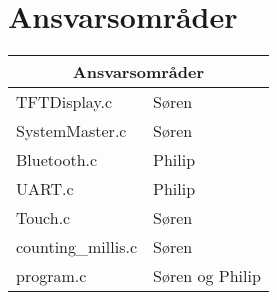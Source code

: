 \graphicspath{{Chapters/Ansvar/}}

\section{Ansvarsområder}
\centering
\label{test_resultater}
\begin{tabular}{ |p{4.2cm}|p{4.2cm}|  }
		\hline
		\multicolumn{2}{|c|}{\textbf{Ansvarsområder}} \\
		\hline
		TFTDisplay.c & Søren \\
		\hline
		SystemMaster.c & Søren  \\
		\hline
		Bluetooth.c & Philip  \\
		\hline
		UART.c & Philip  \\
		\hline
		Touch.c & Søren  \\
		\hline
		counting\_millis.c & Søren  \\
		\hline
		program.c & Søren og Philip  \\
		\hline
		
\end{tabular}
